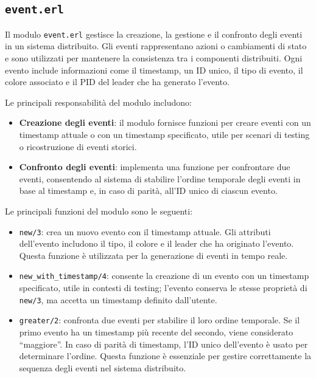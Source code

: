 \documentclass[12pt, a4paper]{report}
\begin{document}
\subsection{\texttt{event.erl}}

Il modulo \texttt{event.erl} gestisce la creazione, la gestione e il confronto degli eventi in un sistema distribuito. Gli eventi rappresentano azioni o cambiamenti di stato e sono utilizzati per mantenere la consistenza tra i componenti distribuiti. Ogni evento include informazioni come il timestamp, un ID unico, il tipo di evento, il colore associato e il PID del leader che ha generato l'evento.

Le principali responsabilità del modulo includono:

\begin{itemize}
    \item \textbf{Creazione degli eventi}: il modulo fornisce funzioni per creare eventi con un timestamp attuale o con un timestamp specificato, utile per scenari di testing o ricostruzione di eventi storici.

    \item \textbf{Confronto degli eventi}: implementa una funzione per confrontare due eventi, consentendo al sistema di stabilire l'ordine temporale degli eventi in base al timestamp e, in caso di parità, all'ID unico di ciascun evento.

\end{itemize}

\noindent
Le principali funzioni del modulo sono le seguenti:

\begin{itemize}
    \item \texttt{new/3}: crea un nuovo evento con il timestamp attuale. Gli attributi dell'evento includono il tipo, il colore e il leader che ha originato l'evento. Questa funzione \`e utilizzata per la generazione di eventi in tempo reale.

    \item \texttt{new\_with\_timestamp/4}: consente la creazione di un evento con un timestamp specificato, utile in contesti di testing; l'evento conserva le stesse proprietà di \texttt{new/3}, ma accetta un timestamp definito dall'utente.

    \item \texttt{greater/2}: confronta due eventi per stabilire il loro ordine temporale. Se il primo evento ha un timestamp più recente del secondo, viene considerato ``maggiore''. In caso di parità di timestamp, l'ID unico dell'evento \`e usato per determinare l'ordine. Questa funzione \`e essenziale per gestire correttamente la sequenza degli eventi nel sistema distribuito.

\end{itemize}
\end{document}
